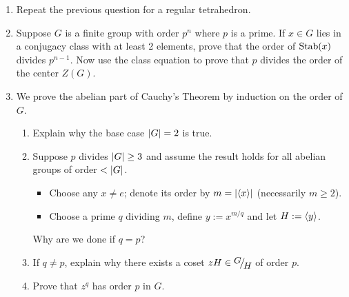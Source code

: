 \begin{exercises}{}{}
\begin{enumerate}
	
		\item Repeat the previous question for a regular tetrahedron.
		
		
		
		\item Suppose $G$ is a finite group with order $p^n$ where $p$ is a prime. If $x\in G$ lies in a conjugacy class with at least 2 elements, prove that the order of $\operatorname{Stab}(x)$ divides $p^{n-1}$. Now use the class equation to prove that $p$ divides the order of the center $Z(G)$.
	
		
		\item We prove the abelian part of Cauchy's Theorem by induction on the order of $G$.
		\begin{enumerate}
		  \item Explain why the base case $\left| G\right|=2$ is true.
		  \item Suppose $p$ divides $\left| G\right|\ge 3$ and assume the result holds for all abelian groups of order $<\left| G\right|$.
		  \begin{itemize}
				\item Choose any $x\neq e$; denote its order by $m=\left| \left\langle x\right\rangle\right|$ (necessarily $m\ge 2$).
				\item Choose a prime $q$ dividing $m$, define $y:=x^{m/q}$ and let $H:=\left\langle y\right\rangle$.
			\end{itemize}
			Why are we done if $q=p$?
		  \item If $q\neq p$, explain why there exists a coset $zH\in \quotient GH$ of order $p$.
		  \item Prove that $z^q$ has order $p$ in $G$.
		\end{enumerate}
		
		
		

\end{enumerate}
\end{exercises}

